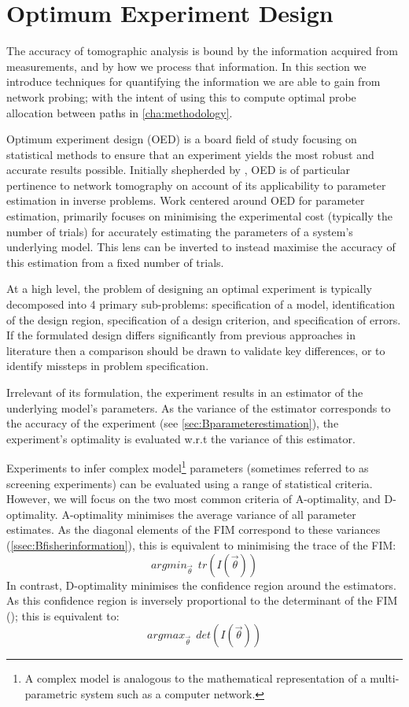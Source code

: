 \section{Optimum Experiment Design}
\label{sec:Boptimization}
The accuracy of tomographic analysis is bound by the information acquired from measurements, and by how we process that information. In this section we introduce techniques for quantifying the information we are able to gain from network probing; with the intent of using this to compute optimal probe allocation between paths in \cref{cha:methodology}.\par
Optimum experiment design (OED) is a board field of study focusing on statistical methods to ensure that an experiment yields the most robust and accurate results possible. Initially shepherded by \cite{smith_standard_1918}, OED is of particular pertinence to network tomography on account of its applicability to parameter estimation in inverse problems. Work centered around OED for parameter estimation, primarily focuses on minimising the experimental cost (typically the number of trials) for accurately estimating the parameters of a system's underlying model. This lens can be inverted to instead maximise the accuracy of this estimation from a fixed number of trials.\par
At a high level, the problem of designing an optimal experiment is typically decomposed into 4 primary sub-problems: specification of a model, identification of the design region, specification of a design criterion, and specification of errors. If the formulated design differs significantly from previous approaches in literature then a comparison should be drawn to validate key differences, or to identify missteps in problem specification.\par
Irrelevant of its formulation, the experiment results in an estimator of the underlying model's parameters. As the variance of the estimator corresponds to the accuracy of the experiment (see \cref{sec:Bparameterestimation}), the experiment's optimality is evaluated w.r.t the variance of this estimator.\par
Experiments to infer complex model\footnote{A complex model is analogous to the mathematical representation of a multi-parametric system such as a computer network.} parameters (sometimes referred to as screening experiments) can be evaluated using a range of statistical criteria. However, we will focus on the two most common criteria of A-optimality, and D-optimality. A-optimality minimises the average variance of all parameter estimates. As the diagonal elements of the FIM correspond to these variances (\cref{ssec:Bfisherinformation}), this is equivalent to minimising the trace of the FIM:
\begin{equation*}
    argmin_{\vec{\theta}}\ \ tr\left(I(\vec{\theta})\right)
\end{equation*}
In contrast, D-optimality minimises the confidence region around the estimators. As this confidence region is inversely proportional to the determinant of the FIM (\cite{jones_-optimal_2021}); this is equivalent to:
\begin{equation*}
argmax_{\vec{\theta}}\ \ det\left(I(\vec{\theta})\right)
\end{equation*}

